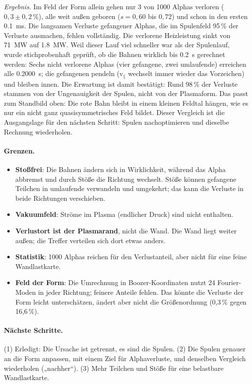 \emph{Ergebnis.} Im Feld der Form allein gehen nur 3 von 1000 Alphas verloren ($0{,}3 \pm 0{,}2$\,\%), alle weit
außen geboren ($s = 0{,}60$ bis $0{,}72$) und schon in den ersten \SI{0,1}{ms}. Die langsamen Verluste gefangener
Alphas, die im Spulenfeld 95\,\% der Verluste ausmachen, fehlen vollständig. Die verlorene Heizleistung sinkt von
\SI{71}{MW} auf \SI{1,8}{MW}. Weil dieser Lauf viel schneller war als der Spulenlauf, wurde stichprobenhaft
geprüft, ob die Bahnen wirklich bis \SI{0,2}{s} gerechnet werden: Sechs nicht verlorene Alphas (vier gefangene, zwei
umlaufende) erreichen alle \SI{0,2000}{s}; die gefangenen pendeln (v$_\parallel$ wechselt immer wieder das
Vorzeichen) und bleiben innen. Die Erwartung ist damit bestätigt: Rund 98\,\% der Verluste stammen von der
Ungenauigkeit der Spulen, nicht von der Plasmaform. Das passt zum Standbild oben: Die rote Bahn bleibt in einem
kleinen Feldtal hängen, wie es nur ein nicht ganz quasisymmetrisches Feld bildet. Dieser Vergleich ist die
Ausgangslage für den nächsten Schritt: Spulen nachoptimieren und dieselbe Rechnung wiederholen.

\paragraph{Grenzen.}
\begin{itemize}\itemsep1pt
\item \textbf{Stoßfrei}: Die Bahnen ändern sich in Wirklichkeit, während das Alpha abbremst und durch Stöße die
  Richtung wechselt. Stöße können gefangene Teilchen in umlaufende verwandeln und umgekehrt; das kann die Verluste
  in beide Richtungen verschieben.
\item \textbf{Vakuumfeld}: Ströme im Plasma (endlicher Druck) sind nicht enthalten.
\item \textbf{Verlustort ist der Plasmarand}, nicht die Wand. Die Wand liegt weiter außen; die Treffer verteilen sich
  dort etwas anders.
\item \textbf{Statistik}: 1000 Alphas reichen für den Verlustanteil, aber nicht für eine feine Wandlastkarte.
\item \textbf{Feld der Form}: Die Umrechnung in Boozer-Koordinaten nutzt 24 Fourier-Moden in jeder Richtung; feinere
  Anteile fehlen. Das könnte die Verluste der Form leicht unterschätzen, ändert aber nicht die Größenordnung
  (0,3\,\% gegen 16,6\,\%).
\end{itemize}

\paragraph{Nächste Schritte.} (1) Erledigt: Die Ursache ist getrennt, es sind die Spulen. (2) Die Spulen genauer an
die Form anpassen, mit einem Ziel für Alphaverluste, und denselben Vergleich wiederholen („nachher“).
(3) Mehr Teilchen und Stöße für eine belastbare Wandlastkarte.
